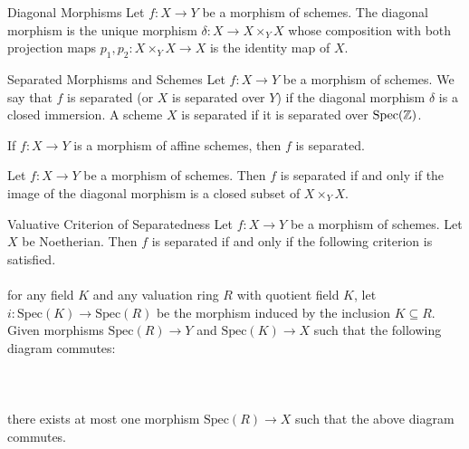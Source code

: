 \documentclass[a4paper]{article}
\begin{document}
\begin{defn}{Diagonal Morphisms}{} Let $f:X\to Y$ be a morphism of schemes. The diagonal morphism is the unique morphism $\delta:X\to X\times_Y X$ whose composition with both projection maps $p_1,p_2:X\times_Y X\to X$ is the identity map of $X$. 
\end{defn}

\begin{defn}{Separated Morphisms and Schemes}{} Let $f:X\to Y$ be a morphism of schemes. We say that $f$ is separated (or $X$ is separated over $Y$) if the diagonal morphism $\delta$ is a closed immersion. A scheme $X$ is separated if it is separated over $\text{Spec}(\mathbb{Z})$. 
\end{defn}

\begin{prp}{}{} If $f:X\to Y$ is a morphism of affine schemes, then $f$ is separated. 
\end{prp}

\begin{prp}{}{} Let $f:X\to Y$ be a morphism of schemes. Then $f$ is separated if and only if the image of the diagonal morphism is a closed subset of $X\times_Y X$. 
\end{prp}

\begin{thm}{Valuative Criterion of Separatedness}{} Let $f:X\to Y$ be a morphism of schemes. Let $X$ be Noetherian. Then $f$ is separated if and only if the following criterion is satisfied. \\~\\

for any field $K$ and any valuation ring $R$ with quotient field $K$, let $i:\text{Spec}(K)\to\text{Spec}(R)$ be the morphism induced by the inclusion $K\subseteq R$. Given morphisms $\text{Spec}(R)\to Y$ and $\text{Spec}(K)\to X$ such that the following diagram commutes: \\~\\
 \\~\\
there exists at most one morphism $\text{Spec}(R)\to X$ such that the above diagram commutes. 
\end{thm}
\end{document}
